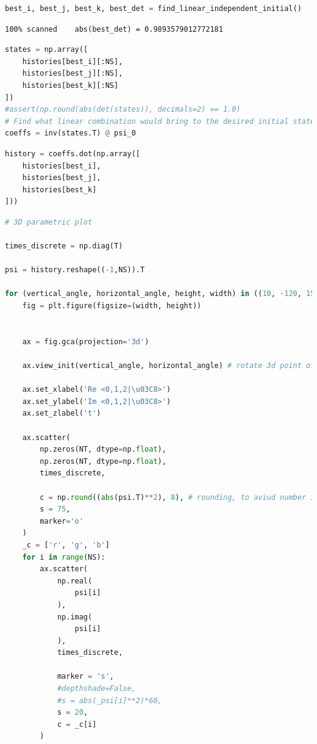 \begin{lstlisting}[language=Python]
best_i, best_j, best_k, best_det = find_linear_independent_initial()
\end{lstlisting}

\begin{lstlisting}
100% scanned    abs(best_det) = 0.9893579012772181
\end{lstlisting}

\begin{lstlisting}[language=Python]
states = np.array([
    histories[best_i][:NS],
    histories[best_j][:NS],
    histories[best_k][:NS]
])
#assert(np.round(abs(det(states)), decimals=2) == 1.0)
# Find what linear combination would bring to the desired initial state psi_0_n
coeffs = inv(states.T) @ psi_0
\end{lstlisting}

\begin{lstlisting}[language=Python]
history = coeffs.dot(np.array([
    histories[best_i],
    histories[best_j],
    histories[best_k]
]))
\end{lstlisting}

\begin{lstlisting}[language=Python]
# 3D parametric plot

times_discrete = np.diag(T)

psi = history.reshape((-1,NS)).T

for (vertical_angle, horizontal_angle, height, width) in ((10, -120, 15, 25), (80, -100, 15, 25)):
    fig = plt.figure(figsize=(width, height))


    ax = fig.gca(projection='3d')

    ax.view_init(vertical_angle, horizontal_angle) # rotate 3d point of view

    ax.set_xlabel('Re <0,1,2|\u03C8>')
    ax.set_ylabel('Im <0,1,2|\u03C8>')
    ax.set_zlabel('t')
    
    ax.scatter(
        np.zeros(NT, dtype=np.float),
        np.zeros(NT, dtype=np.float),
        times_discrete,
    
        c = np.round((abs(psi.T)**2), 8), # rounding, to aviud number instability causing out-of-range rgb vals
        s = 75,
        marker='o'
    )
    _c = ['r', 'g', 'b']
    for i in range(NS):
        ax.scatter(
            np.real(
                psi[i]
            ),
            np.imag(
                psi[i]
            ),
            times_discrete,

            marker = 's',
            #depthshade=False,
            #s = abs(_psi[i]**2)*60,
            s = 20,
            c = _c[i]
        )
\end{lstlisting}

